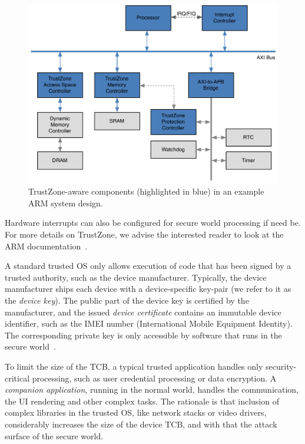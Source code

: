 \begin{figure}[!ht]
    \centering
    \includegraphics[width=.9\linewidth]{figures/phonesecures/tee_tz_internal}
    \caption[TrustZone-aware components in an example ARM system design]{TrustZone-aware components (highlighted in blue) in an example ARM system design.}
    \label{fig:ps_tz_internal}
\end{figure}

Hardware interrupts can also be configured for secure world processing if need be. For more details on TrustZone, we advise the interested reader to look at the ARM documentation~\cite{ARMTrustZone}.

A standard trusted OS only allows execution of code that has been signed by a
trusted authority, such as the device manufacturer. Typically, the device
manufacturer ships each device with a device-specific key-pair (we refer to it
as the \emph{device key}). The public part of the device key is certified by the
manufacturer, and the issued \emph{device certificate} contains an immutable
device identifier, such as the IMEI number (International Mobile Equipment
Identity).  The corresponding private key is only accessible by software that
runs in the secure world~\cite{kostiainen2011codaspy}.

To limit the size of the TCB, a typical trusted application handles only
security-critical processing, such as user credential processing or data
encryption. A \emph{companion application}, running in the normal world, handles
the communication, the UI rendering and other complex tasks.  The rationale is
that inclusion of complex libraries in the trusted OS, like network stacks or
video drivers, considerably increases the size of the device TCB, and with that
the attack surface of the secure world.

